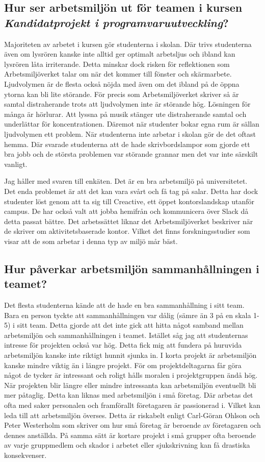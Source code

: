 \subsection{Hur ser arbetsmiljön ut för teamen i kursen \textit{Kandidatprojekt i programvaruutveckling}?}
Majoriteten av arbetet i kursen gör studenterna i skolan. Där trivs studenterna även om lysrören kanske inte alltid ger optimalt arbetsljus och ibland kan lysrören låta irriterande. Detta minskar dock risken för reflektionen som Arbetsmiljöverket talar om när det kommer till fönster och skärmarbete. Ljudvolymen är de flesta också nöjda med även om det ibland på de öppna ytorna kan bli lite störande. För precis som Arbetsmiljöverket skriver så är samtal distraherande trots att ljudvolymen inte är störande hög. Lösningen för många är hörlurar. Att lyssna på musik stänger ute distraherande samtal och underlättar för koncentrationen. Däremot när studenter bokar egna rum är sällan ljudvolymen ett problem. När studenterna inte arbetar i skolan gör de det oftast hemma. Där svarade studenterna att de hade skrivbordslampor som gjorde ett bra jobb och de största problemen var störande grannar men det var inte särskilt vanligt. 

Jag håller med svaren till enkäten. Det är en bra arbetsmiljö på universitetet. Det enda problemet är att det kan vara svårt och få tag på salar. Detta har dock studenter löst genom att ta sig till Creactive, ett öppet kontorslandskap utanför campus. De har också valt att jobba hemifrån och kommunicera över Slack då detta passat bättre. Det arbetssättet liknar det Arbetsmiljöverket beskriver när de skriver om aktivitetsbaserade kontor. Vilket det finns forskningsstudier som visar att de som arbetar i denna typ av miljö mår bäst.

\subsection{Hur påverkar arbetsmiljön sammanhållningen i teamet?}
Det flesta studenterna kände att de hade en bra sammanhållning i sitt team. Bara en person tyckte att sammanhållningen var dålig (sämre än 3 på en skala 1-5) i sitt team. Detta gjorde att det inte gick att hitta något samband mellan arbetsmiljön och sammanhållningen i teamet. Istället såg jag att studenternas intresse för projekten också var hög. Detta fick mig att fundera på huruvida arbetsmiljön kanske inte riktigt hunnit sjunka in. I korta projekt är arbetsmiljön kanske mindre viktig än i längre projekt. För om projektdeltagarna får göra något de tycker är intressant och roligt hålls moralen i projektgruppen ändå hög. När projekten blir längre eller mindre intressanta kan arbetsmiljön eventuellt bli mer påtaglig. Detta kan liknas med arbetsmiljön i små företag. Där arbetas det ofta med saker personalen och framförallt företagaren är passionerad i. Vilket kan leda till att arbetsmiljön överses. Detta är riskabelt enligt Carl-Göran Ohlson och Peter Westerholm som skriver om hur små företag är beroende av företagaren och dennes anställda. På samma sätt är kortare projekt i små grupper ofta beroende av varje gruppmedlem och skador i arbetet eller sjukskrivning kan få drastiska konsekvenser. 

